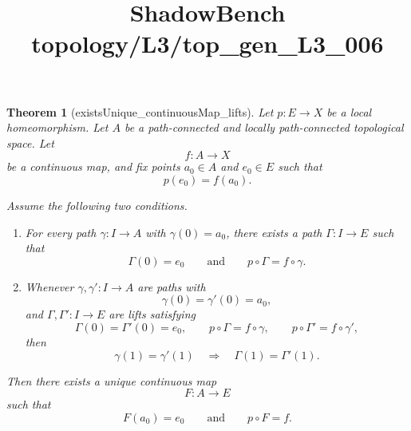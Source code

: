 \documentclass{article}
\title{ShadowBench topology/L3/top\_gen\_L3\_006}
\newtheorem{theorem}{Theorem}
\begin{document}
\maketitle

\begin{theorem}[existsUnique_continuousMap_lifts]
Let \(p:E\to X\) be a local homeomorphism. Let \(A\) be a path-connected and locally path-connected topological space. Let
\[
f:A\to X
\]
be a continuous map, and fix points \(a_0\in A\) and \(e_0\in E\) such that
\[
p(e_0)=f(a_0).
\]

Assume the following two conditions.

\begin{enumerate}
\item For every path \(\gamma:I\to A\) with \(\gamma(0)=a_0\), there exists a path \(\Gamma:I\to E\) such that
\[
\Gamma(0)=e_0
\qquad\text{and}\qquad
p\circ \Gamma = f\circ \gamma .
\]

\item Whenever \(\gamma,\gamma':I\to A\) are paths with
\[
\gamma(0)=\gamma'(0)=a_0,
\]
and \(\Gamma,\Gamma':I\to E\) are lifts satisfying
\[
\Gamma(0)=\Gamma'(0)=e_0,\qquad
p\circ\Gamma=f\circ\gamma,\qquad
p\circ\Gamma'=f\circ\gamma',
\]
then
\[
\gamma(1)=\gamma'(1)\quad\Longrightarrow\quad \Gamma(1)=\Gamma'(1).
\]
\end{enumerate}

Then there exists a unique continuous map
\[
F:A\to E
\]
such that
\[
F(a_0)=e_0
\qquad\text{and}\qquad
p\circ F=f.
\]
\end{theorem}
\end{document}
